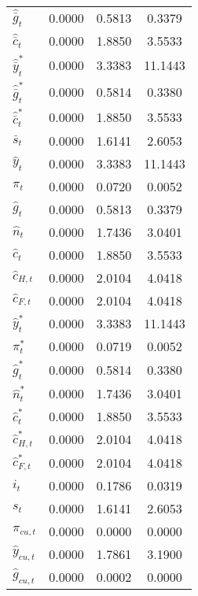 \begin{center}
\begin{longtable}{lccc}
${\hat {\bar g}_t}    $	 & 	       0.0000	 & 	       0.5813	 & 	       0.3379 \\ 
${\hat {\bar c}_t}    $	 & 	       0.0000	 & 	       1.8850	 & 	       3.5533 \\ 
${\hat {\bar y}_t^*}  $	 & 	       0.0000	 & 	       3.3383	 & 	      11.1443 \\ 
${\hat {\bar g}_t^*}  $	 & 	       0.0000	 & 	       0.5814	 & 	       0.3380 \\ 
${\hat {\bar c}_t^*}  $	 & 	       0.0000	 & 	       1.8850	 & 	       3.5533 \\ 
${\bar s_t}           $	 & 	       0.0000	 & 	       1.6141	 & 	       2.6053 \\ 
${\hat y_t}           $	 & 	       0.0000	 & 	       3.3383	 & 	      11.1443 \\ 
${\pi_t}              $	 & 	       0.0000	 & 	       0.0720	 & 	       0.0052 \\ 
${\hat g_t}           $	 & 	       0.0000	 & 	       0.5813	 & 	       0.3379 \\ 
${\hat n_t}           $	 & 	       0.0000	 & 	       1.7436	 & 	       3.0401 \\ 
${\hat c_t}           $	 & 	       0.0000	 & 	       1.8850	 & 	       3.5533 \\ 
${\hat c_{H,t}}       $	 & 	       0.0000	 & 	       2.0104	 & 	       4.0418 \\ 
${\hat c_{F,t}}       $	 & 	       0.0000	 & 	       2.0104	 & 	       4.0418 \\ 
${\hat y_t^*}         $	 & 	       0.0000	 & 	       3.3383	 & 	      11.1443 \\ 
${\pi_t^*}            $	 & 	       0.0000	 & 	       0.0719	 & 	       0.0052 \\ 
${\hat g_t^*}         $	 & 	       0.0000	 & 	       0.5814	 & 	       0.3380 \\ 
${\hat n_t^*}         $	 & 	       0.0000	 & 	       1.7436	 & 	       3.0401 \\ 
${\hat c_t^*}         $	 & 	       0.0000	 & 	       1.8850	 & 	       3.5533 \\ 
${\hat c_{H,t}^*}     $	 & 	       0.0000	 & 	       2.0104	 & 	       4.0418 \\ 
${\hat c_{F,t}^*}     $	 & 	       0.0000	 & 	       2.0104	 & 	       4.0418 \\ 
${i_t}                $	 & 	       0.0000	 & 	       0.1786	 & 	       0.0319 \\ 
${s_t}                $	 & 	       0.0000	 & 	       1.6141	 & 	       2.6053 \\ 
${\pi_{cu,t}}         $	 & 	       0.0000	 & 	       0.0000	 & 	       0.0000 \\ 
${\hat y_{cu,t}}      $	 & 	       0.0000	 & 	       1.7861	 & 	       3.1900 \\ 
${\hat g_{cu,t}}      $	 & 	       0.0000	 & 	       0.0002	 & 	       0.0000 \\ 
\end{longtable}
 \end{center}
